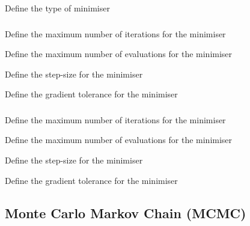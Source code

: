 
 {Define the type of minimiser}

\subsubsection[Numerical differences minimiser]{} 

 {Define the maximum number of iterations for the minimiser}

 {Define the maximum number of evaluations for the minimiser}

 {Define the step-size for the minimiser}

 {Define the gradient tolerance for the minimiser}

\subsubsection[Differential evolution minimiser]{} 

 {Define the maximum number of iterations for the minimiser}

 {Define the maximum number of evaluations for the minimiser}

 {Define the step-size for the minimiser}

 {Define the gradient tolerance for the minimiser}

\subsection{Monte Carlo Markov Chain (MCMC)\label{sec:estimation-syntax-MCMC}}

